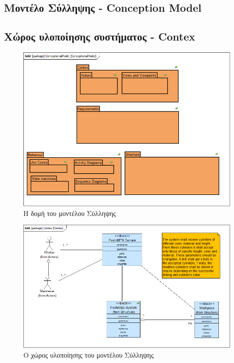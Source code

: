 \documentclass[a4paper,12pt,twoside]{report}
\begin{document}
{\begin{appendices}
		\section{Μοντέλο Σύλληψης - Conception Model}
			
			\subsection{Χώρος υλοποίησης συστήματος - Contex}
			
				\clearpage
				\begin{figure}[hp]
					\centering
					\includegraphics[scale=0.45]{ConceptionalModel_ConceptionalModel.png}
					\caption{Η δομή του μοντέλου Σύλληψης}
					\label{φωτ:Η δομή του μοντέλου Σύλληψης}
				\end{figure}
				
				\begin{figure}[hp]
					\centering
					\includegraphics[scale=0.45]{ConceptionalModel_Contex.png}
					\caption{Ο χώρος υλοποίησης του μοντέλου Σύλληψης}
					\label{φωτ:Ο χώρος υλοποίησης του μοντέλου Σύλληψης}
				\end{figure}
				

\end{appendices}}
\end{document}
